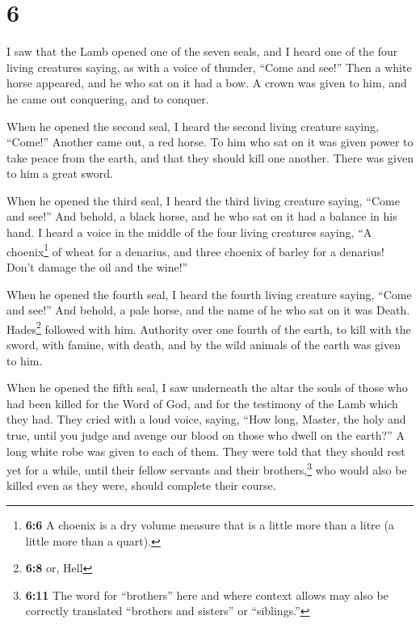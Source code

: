 \hypertarget{section-5}{%
\section{6}\label{section-5}}

 I saw that the Lamb opened one of the seven seals, and I
heard one of the four living creatures saying, as with a voice of
thunder, ``Come and see!''  Then a white horse appeared,
and he who sat on it had a bow. A crown was given to him, and he came
out conquering, and to conquer.

 When he opened the second seal, I heard the second living
creature saying, ``Come!''  Another came out, a red horse.
To him who sat on it was given power to take peace from the earth, and
that they should kill one another. There was given to him a great sword.

 When he opened the third seal, I heard the third living
creature saying, ``Come and see!'' And behold, a black horse, and he who
sat on it had a balance in his hand.  I heard a voice in
the middle of the four living creatures saying, ``A choenix\footnote{\textbf{6:6}
  A choenix is a dry volume measure that is a little more than a litre
  (a little more than a quart).} of wheat for a denarius, and three
choenix of barley for a denarius! Don't damage the oil and the wine!''

 When he opened the fourth seal, I heard the fourth living
creature saying, ``Come and see!''  And behold, a pale
horse, and the name of he who sat on it was Death. Hades\footnote{\textbf{6:8}
  or, Hell} followed with him. Authority over one fourth of the earth,
to kill with the sword, with famine, with death, and by the wild animals
of the earth was given to him.

 When he opened the fifth seal, I saw underneath the altar
the souls of those who had been killed for the Word of God, and for the
testimony of the Lamb which they had.  They cried with a
loud voice, saying, ``How long, Master, the holy and true, until you
judge and avenge our blood on those who dwell on the earth?''
 A long white robe was given to each of them. They were
told that they should rest yet for a while, until their fellow servants
and their brothers,\footnote{\textbf{6:11} The word for ``brothers''
  here and where context allows may also be correctly translated
  ``brothers and sisters'' or ``siblings.''} who would also be killed
even as they were, should complete their course.

